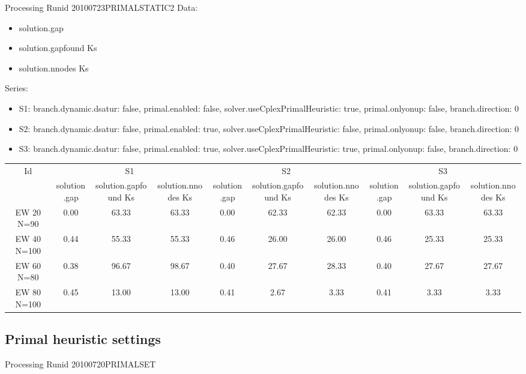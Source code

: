 \documentclass[landscape, 12pt]{report}
\begin{document}
	Processing Runid 20100723PRIMALSTATIC2
	Data:
	\begin{itemize}
	\item solution.gap
	\item solution.gapfound Ks
	\item solution.nnodes Ks
	\end{itemize}
	Series:
	\begin{itemize}
	\item S1: branch.dynamic.dsatur: false, primal.enabled: false, solver.useCplexPrimalHeuristic: true, primal.onlyonup: false, branch.direction: 0
	\item S2: branch.dynamic.dsatur: false, primal.enabled: true, solver.useCplexPrimalHeuristic: false, primal.onlyonup: false, branch.direction: 0
	\item S3: branch.dynamic.dsatur: false, primal.enabled: true, solver.useCplexPrimalHeuristic: true, primal.onlyonup: false, branch.direction: 0
	\end{itemize}
	\begin{tabular}{|c|ccc|ccc|ccc|}
	\hline
	\multicolumn{1}{|c|}{Id} & \multicolumn{3}{|c|}{S1} & \multicolumn{3}{|c|}{S2} & \multicolumn{3}{|c|}{S3}
	\\
	 & solution.gap & solution.gapfound Ks & solution.nnodes Ks & solution.gap & solution.gapfound Ks & solution.nnodes Ks & solution.gap & solution.gapfound Ks & solution.nnodes Ks
	\\
	\hline
	EW 20 N=90 & 0.00 & 63.33 & 63.33 & 0.00 & 62.33 & 62.33 & 0.00 & 63.33 & 63.33
	\\
	EW 40 N=100 & 0.44 & 55.33 & 55.33 & 0.46 & 26.00 & 26.00 & 0.46 & 25.33 & 25.33
	\\
	EW 60 N=80 & 0.38 & 96.67 & 98.67 & 0.40 & 27.67 & 28.33 & 0.40 & 27.67 & 27.67
	\\
	EW 80 N=100 & 0.45 & 13.00 & 13.00 & 0.41 & 2.67 & 3.33 & 0.41 & 3.33 & 3.33
	\\
	\hline 
	 \end{tabular}
	
	
	
	\clearpage
	
	\subsection{Primal heuristic settings}
	
	Processing Runid 20100720PRIMALSET
\end{document}
